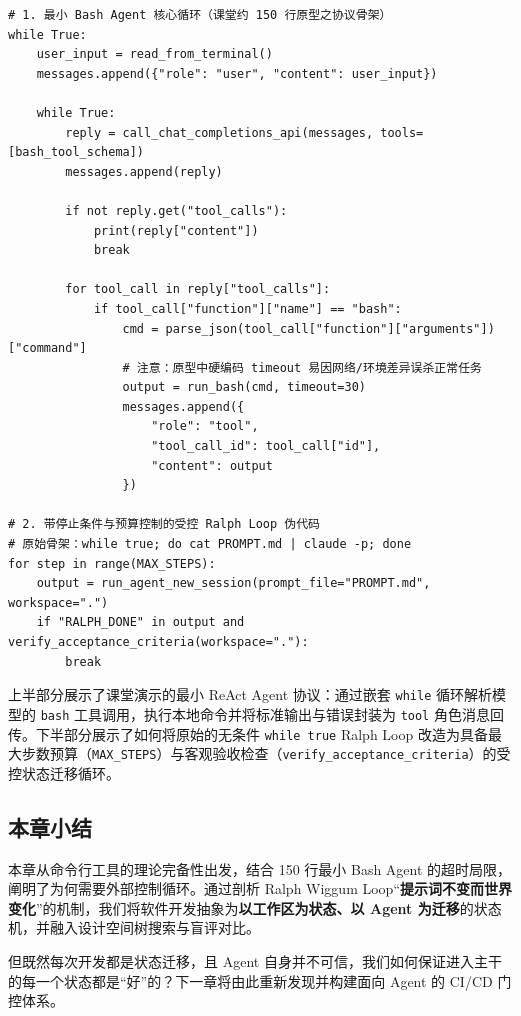 \documentclass[UTF8,a4paper,11pt,fontset=fandol]{ctexart}
\begin{document}
\begin{lstlisting}[basicstyle={\ttfamily\small\linespread{1}\selectfont},captionpos=t,caption={最小 Bash Agent 核心循环与 Ralph Loop 外部脚本骨架}]
# 1. 最小 Bash Agent 核心循环（课堂约 150 行原型之协议骨架）
while True:
    user_input = read_from_terminal()
    messages.append({"role": "user", "content": user_input})

    while True:
        reply = call_chat_completions_api(messages, tools=[bash_tool_schema])
        messages.append(reply)

        if not reply.get("tool_calls"):
            print(reply["content"])
            break

        for tool_call in reply["tool_calls"]:
            if tool_call["function"]["name"] == "bash":
                cmd = parse_json(tool_call["function"]["arguments"])["command"]
                # 注意：原型中硬编码 timeout 易因网络/环境差异误杀正常任务
                output = run_bash(cmd, timeout=30)
                messages.append({
                    "role": "tool",
                    "tool_call_id": tool_call["id"],
                    "content": output
                })

# 2. 带停止条件与预算控制的受控 Ralph Loop 伪代码
# 原始骨架：while true; do cat PROMPT.md | claude -p; done
for step in range(MAX_STEPS):
    output = run_agent_new_session(prompt_file="PROMPT.md", workspace=".")
    if "RALPH_DONE" in output and verify_acceptance_criteria(workspace="."):
        break
\end{lstlisting}

上半部分展示了课堂演示的最小 ReAct Agent 协议：通过嵌套 \texttt{while} 循环解析模型的 \texttt{bash} 工具调用，执行本地命令并将标准输出与错误封装为 \texttt{tool} 角色消息回传。下半部分展示了如何将原始的无条件 \texttt{while true} Ralph Loop 改造为具备最大步数预算（\texttt{MAX\_STEPS}）与客观验收检查（\texttt{verify\_acceptance\_criteria}）的受控状态迁移循环。

\subsection{本章小结}

本章从命令行工具的理论完备性出发，结合 150 行最小 Bash Agent 的超时局限，阐明了为何需要外部控制循环。通过剖析 Ralph Wiggum Loop“\textbf{提示词不变而世界变化}”的机制，我们将软件开发抽象为\textbf{以工作区为状态、以 Agent 为迁移}的状态机，并融入设计空间树搜索与盲评对比。

但既然每次开发都是状态迁移，且 Agent 自身并不可信，我们如何保证进入主干的每一个状态都是“好”的？下一章将由此重新发现并构建面向 Agent 的 CI/CD 门控体系。
\end{document}
